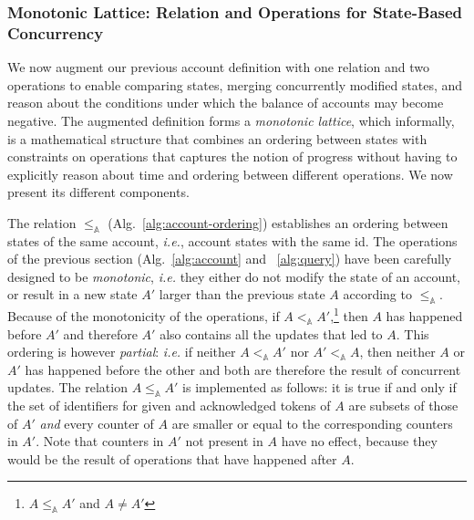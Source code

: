 \documentclass[9pt]{article}   	%
\begin{document}
\subsubsection{Monotonic Lattice: Relation and Operations for State-Based Concurrency}
\label{sec:account:ordering-merging}

We now augment our previous account definition with one relation and two operations to enable comparing states, merging concurrently modified states, and reason about the conditions under which the balance of accounts may become negative. The augmented definition forms a \textit{monotonic lattice}, which informally, is a mathematical structure that combines an ordering between states with constraints on operations that captures the notion of progress without having to explicitly reason about time and ordering between different operations. We now present its different components.

The relation $\leq_\mathds{A}$ (Alg.~\ref{alg:account-ordering}) establishes an ordering between states of the same account, \textit{i.e.}, account states with the same id. The operations of the previous section (Alg.~\ref{alg:account} and ~\ref{alg:query}) have been carefully designed to be \textit{monotonic}, \textit{i.e.} they either do not modify the state of an account, or result in a new state $A'$ larger than the previous state $A$ according to $\leq_\mathds{A}$. Because of the monotonicity of the operations, if $A <_\mathds{A} A'$,\footnote{$A \leq_\mathds{A} A'$ and $A \neq A'$} then $A$ has happened before $A'$ and therefore $A'$ also contains all the updates that led to $A$. This ordering is however \textit{partial}: \textit{i.e.} if neither $A <_\mathds{A} A'$ nor $A' <_\mathds{A} A$, then neither $A$ or $A'$ has happened before the other and both are therefore the result of concurrent updates. The relation $A \leq_\mathds{A} A'$ is implemented as follows: it is true if and only if the set of identifiers for given and acknowledged tokens of $A$ are subsets of those of $A'$ \textit{and} every counter of $A$ are smaller or equal to the corresponding counters in $A'$. Note that counters in $A'$ not present in $A$ have no effect, because they would be the result of operations that have happened after $A$. 
\end{document}
